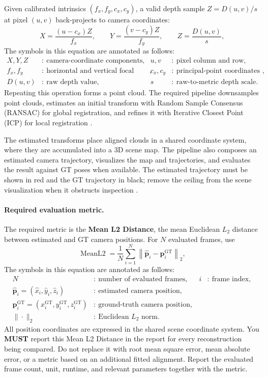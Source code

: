 \documentclass[11pt]{article}
\begin{document}
Given calibrated intrinsics $(f_x,f_y,c_x,c_y)$, a valid depth sample $Z=D(u,v)/s$ at pixel $(u,v)$ back-projects to camera coordinates:
\[
X=\frac{(u-c_x)Z}{f_x},\qquad Y=\frac{(v-c_y)Z}{f_y},\qquad Z=\frac{D(u,v)}{s},
\]
The symbols in this equation are annotated as follows:
\[
\begin{aligned}
X,Y,Z &:\ \text{camera-coordinate components}, & u,v &:\ \text{pixel column and row},\\
f_x,f_y &:\ \text{horizontal and vertical focal lengths (pixels)}, & c_x,c_y &:\ \text{principal-point coordinates (pixels)},\\
D(u,v) &:\ \text{raw depth value}, & s &:\ \text{raw-to-metric depth scale}.
\end{aligned}
\]
Repeating this operation forms a point cloud. The required pipeline downsamples point clouds, estimates an initial transform with Random Sample Consensus (RANSAC) for global registration, and refines it with Iterative Closest Point (ICP) for local registration \cite{hartley2004multiple,fischler1981ransac,chen1992object,open3dglobal}.

The estimated transforms place aligned clouds in a shared coordinate system, where they are accumulated into a 3D scene map. The pipeline also composes an estimated camera trajectory, visualizes the map and trajectories, and evaluates the result against GT poses when available. The estimated trajectory must be shown in red and the GT trajectory in black; remove the ceiling from the scene visualization when it obstructs inspection \cite{replica2019}.

\paragraph{Required evaluation metric.}
The required metric is the \textbf{Mean L2 Distance}, the mean Euclidean $L_2$ distance between estimated and GT camera positions. For $N$ evaluated frames, use
\[
\operatorname{MeanL2}=\frac{1}{N}\sum_{i=1}^{N}\left\|\hat{\mathbf p}_i-\mathbf p_i^{\mathrm{GT}}\right\|_2,
\]
The symbols in this equation are annotated as follows:
\[
\begin{aligned}
N &:\ \text{number of evaluated frames}, & i &:\ \text{frame index},\\
\hat{\mathbf p}_i=(\hat{x}_i,\hat{y}_i,\hat{z}_i) &:\ \text{estimated camera position},\\
\mathbf p_i^{\mathrm{GT}}=(x_i^{\mathrm{GT}},y_i^{\mathrm{GT}},z_i^{\mathrm{GT}}) &:\ \text{ground-truth camera position},\\
\|\cdot\|_2 &:\ \text{Euclidean }L_2\text{ norm}.
\end{aligned}
\]
All position coordinates are expressed in the shared scene coordinate system.
You \textbf{MUST} report this Mean L2 Distance in the report for every reconstruction being compared. Do not replace it with root mean square error, mean absolute error, or a metric based on an additional fitted alignment. Report the evaluated frame count, unit, runtime, and relevant parameters together with the metric.
\end{document}
